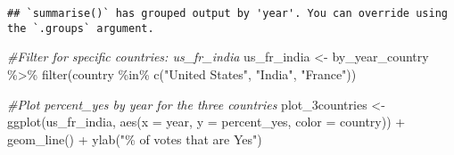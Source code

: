\documentclass[
]{article}
\newenvironment{Shaded}{\begin{snugshade}}{\end{snugshade}}
\newcommand{\AttributeTok}[1]{\textcolor[rgb]{0.77,0.63,0.00}{#1}}
\newcommand{\CommentTok}[1]{\textcolor[rgb]{0.56,0.35,0.01}{\textit{#1}}}
\newcommand{\FunctionTok}[1]{\textcolor[rgb]{0.00,0.00,0.00}{#1}}
\newcommand{\NormalTok}[1]{#1}
\newcommand{\OtherTok}[1]{\textcolor[rgb]{0.56,0.35,0.01}{#1}}
\newcommand{\SpecialCharTok}[1]{\textcolor[rgb]{0.00,0.00,0.00}{#1}}
\newcommand{\StringTok}[1]{\textcolor[rgb]{0.31,0.60,0.02}{#1}}
\begin{document}
\begin{verbatim}
## `summarise()` has grouped output by 'year'. You can override using the `.groups` argument.
\end{verbatim}

\begin{Shaded}
\begin{Highlighting}[]
\CommentTok{\#Filter for specific countries: us\_fr\_india}
\NormalTok{us\_fr\_india }\OtherTok{\textless{}{-}}\NormalTok{ by\_year\_country }\SpecialCharTok{\%\textgreater{}\%}
  \FunctionTok{filter}\NormalTok{(country }\SpecialCharTok{\%in\%} \FunctionTok{c}\NormalTok{(}\StringTok{"United States"}\NormalTok{, }\StringTok{"India"}\NormalTok{, }\StringTok{"France"}\NormalTok{))}

\CommentTok{\#Plot percent\_yes by year for the three countries}
\NormalTok{plot\_3countries }\OtherTok{\textless{}{-}} \FunctionTok{ggplot}\NormalTok{(us\_fr\_india, }\FunctionTok{aes}\NormalTok{(}\AttributeTok{x =}\NormalTok{ year, }\AttributeTok{y =}\NormalTok{ percent\_yes, }\AttributeTok{color =}\NormalTok{ country)) }\SpecialCharTok{+}
  \FunctionTok{geom\_line}\NormalTok{() }\SpecialCharTok{+}
  \FunctionTok{ylab}\NormalTok{(}\StringTok{"\% of votes that are \textquotesingle{}Yes\textquotesingle{}"}\NormalTok{) }
\end{Highlighting}
\end{Shaded}
\end{document}
